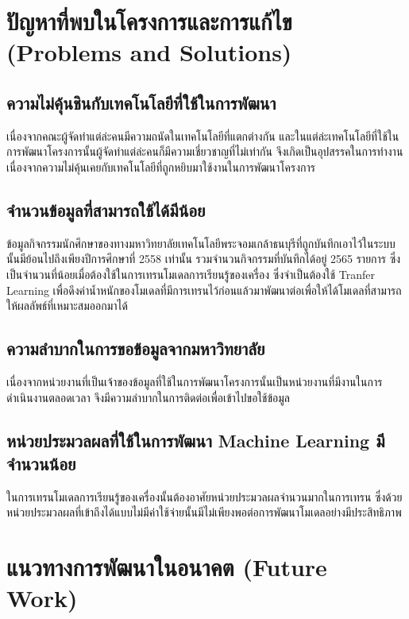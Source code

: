 \documentclass[14pt,oneside,openright,a4paper]{cpe-thai-project}
\begin{document}
\section{ปัญหาที่พบในโครงการและการแก้ไข (Problems and Solutions)}
\subsection{ความไม่คุ้นชินกับเทคโนโลยีที่ใช้ในการพัฒนา}
เนื่องจากคณะผู้จัดทำแต่ล่ะคนมีความถนัดในเทคโนโลยีที่แตกต่างกัน และในแต่ล่ะเทคโนโลยีที่ใช้ในการพัฒนาโครงการนั้นผู้จัดทำแต่ล่ะคนก็มีความเชี่ยวชาญที่ไม่เท่ากัน 
จึงเกิดเป็นอุปสรรคในการทำงานเนื่องจากความไม่คุ้นเคยกับเทคโนโลยีที่ถูกหยิบมาใช้งานในการพัฒนาโครงการ
\subsection{จำนวนข้อมูลที่สามารถใช้ได้มีน้อย}
ข้อมูลกิจกรรมนักศึกษาของทางมหาวิทยาลัยเทคโนโลยีพระจอมเกล้าธนบุรีที่ถูกบันทึกเอาไว้ในระบบนั้นมีย้อนไปถึงเพียงปีการศึกษาที่ 2558 เท่านั้น 
รวมจำนวนกิจกรรมที่บันทึกได้อยู่ 2565 รายการ ซึ่งเป็นจำนวนที่น้อยเมื่อต้องใช้ในการเทรนโมเดลการเรียนรู้ของเครื่อง ซึ่งจำเป็นต้องใช้ Tranfer Learning 
เพื่อดึงค่าน้ำหนักของโมเดลที่มีการเทรนไว้ก่อนแล้วมาพัฒนาต่อเพื่อให้ได้โมเดลที่สามารถให้ผลลัพธ์ที่เหมาะสมออกมาได้
\subsection{ความลำบากในการขอข้อมูลจากมหาวิทยาลัย}
เนื่องจากหน่วยงานที่เป็นเจ้าของข้อมูลที่ใช้ในการพัฒนาโครงการนั้นเป็นหน่วยงานที่มีงานในการดำเนินงานตลอดเวลา จึงมีความลำบากในการติดต่อเพื่อเข้าไปขอใช้ข้อมูล
\subsection{หน่วยประมวลผลที่ใช้ในการพัฒนา Machine Learning มีจำนวนน้อย}
ในการเทรนโมเดลการเรียนรู้ของเครื่องนั้นต้องอาศัยหน่วยประมวลผลจำนวนมากในการเทรน ซึ่งด้วยหน่วยประมวลผลที่เข้าถึงได้แบบไม่มีค่าใช้จ่ายนั้นมีไม่เพียงพอต่อการพัฒนาโมเดลอย่างมีประสิทธิภาพ
\section{แนวทางการพัฒนาในอนาคต (Future Work)}
\makeatletter
\g@addto@macro{\UrlBreaks}{\UrlOrds}
\makeatother



\end{document}
